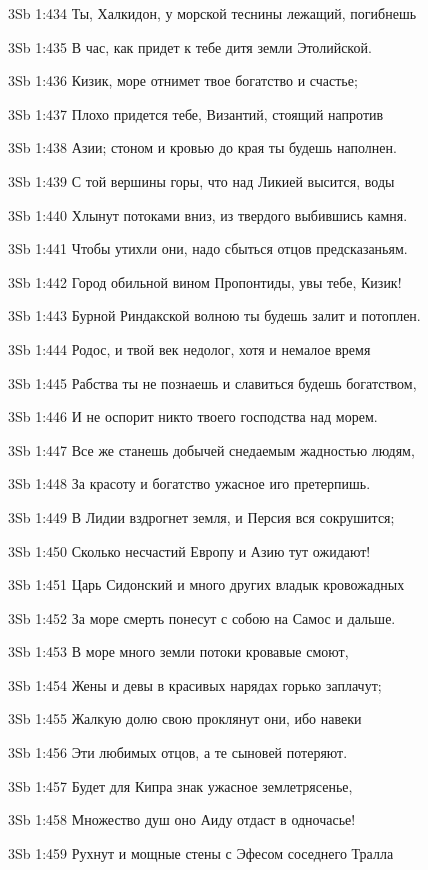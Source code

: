 \vs 3Sb 1:434 Ты, Халкидон, у морской теснины лежащий, погибнешь 

\vs 3Sb 1:435 В час, как придет к тебе дитя земли Этолийской.

\vs 3Sb 1:436 Кизик, море отнимет твое богатство и счастье;

\vs 3Sb 1:437 Плохо придется тебе, Византий, стоящий напротив

\vs 3Sb 1:438 Азии; стоном и кровью до края ты будешь наполнен.

\vs 3Sb 1:439 С той вершины горы, что над Ликией высится, воды 

\vs 3Sb 1:440 Хлынут потоками вниз, из твердого выбившись камня.

\vs 3Sb 1:441 Чтобы утихли они, надо сбыться отцов предсказаньям.

\vs 3Sb 1:442 Город обильной вином Пропонтиды, увы тебе, Кизик! 

\vs 3Sb 1:443 Бурной Риндакской волною ты будешь залит и потоплен.

\vs 3Sb 1:444 Родос, и твой век недолог, хотя и немалое время 

\vs 3Sb 1:445 Рабства ты не познаешь и славиться будешь богатством, 

\vs 3Sb 1:446 И не оспорит никто твоего господства над морем. 

\vs 3Sb 1:447 Все же станешь добычей снедаемым жадностью людям, 

\vs 3Sb 1:448 За красоту и богатство  ужасное иго претерпишь.

\vs 3Sb 1:449 В Лидии вздрогнет земля, и Персия вся сокрушится;

\vs 3Sb 1:450 Сколько несчастий Европу и Азию тут ожидают!

\vs 3Sb 1:451 Царь Сидонский и много других владык кровожадных 

\vs 3Sb 1:452 За море смерть понесут с собою  на Самос и дальше. 

\vs 3Sb 1:453 В море много земли потоки кровавые смоют, 

\vs 3Sb 1:454 Жены и девы в красивых нарядах горько заплачут;

\vs 3Sb 1:455 Жалкую долю свою проклянут они, ибо навеки 

\vs 3Sb 1:456 Эти любимых отцов, а те  сыновей потеряют.

\vs 3Sb 1:457 Будет для Кипра знак  ужасное землетрясенье, 

\vs 3Sb 1:458 Множество душ оно Аиду отдаст в одночасье!

\vs 3Sb 1:459 Рухнут и мощные стены с Эфесом соседнего Тралла 

